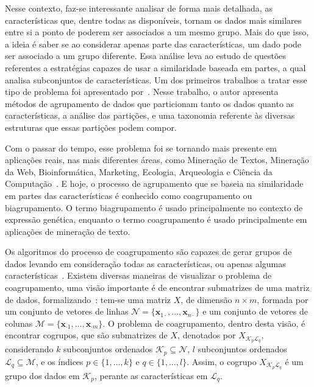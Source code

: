 \documentclass[
    12pt,                %
    oneside,            %
    a4paper,            %
    english,            %
    brazil                %
    ]{abntex2ppgsi}
\begin{document}
Nesse contexto, faz-se interessante analisar de forma mais detalhada, as características que, dentre todas as disponíveis, tornam os dados mais similares entre si a ponto de poderem ser associados a um mesmo grupo.
Mais do que isso, a ideia é saber se ao considerar apenas parte das características, um dado pode ser associado a um grupo diferente.
Essa análise leva ao estudo de questões referentes a estratégias capazes de usar a similaridade baseada em partes, a qual analisa subconjuntos de características.
Um dos primeiros trabalhos a tratar esse tipo de problema foi apresentado por~.
Nesse trabalho, o autor apresenta métodos de agrupamento de dados que particionam tanto os dados quanto as características, a análise das partições, e uma taxonomia referente às diversas estruturas que essas partições podem compor.

Com o passar do tempo, esse problema foi se tornando mais presente em aplicações reais, nas mais diferentes áreas, como Mineração de Textos, Mineração da Web, Bioinformática, Marketing, Ecologia, Arqueologia e Ciência da Computação~\cite{Govaert2013}.
E hoje, o processo de agrupamento que se baseia na similaridade em partes das características é conhecido como coagrupamento ou biagrupamento.
O termo biagrupamento é usado principalmente no contexto de expressão genética, enquanto o termo coagrupamento é usado principalmente em aplicações de mineração de texto.

Os algoritmos do processo de coagrupamento são capazes de gerar grupos de dados levando em consideração todas as características, ou apenas algumas características~\cite{Franca2010,Madeira2004}.
Existem diversas maneiras de visualizar o problema de coagrupamento, uma visão importante é de encontrar submatrizes de uma matriz de dados, formalizando~\cite{Madeira2004}: tem-se uma matriz $X$, de dimensão $n \times m$, formada por um conjunto de vetores de linhas $\mathcal{N} = \{ \mathbf{x}_{1 \cdot}, \dots, \mathbf{x}_{n \cdot} \}$ e um conjunto de vetores de colunas $\mathcal{M} = \{ \mathbf{x}_{\cdot 1}, \dots, \mathbf{x}_{\cdot m} \}$.
O problema de coagrupamento, dentro desta visão, é encontrar cogrupos, que são submatrizes de $X$, denotados por $X_{\mathcal{K}_p \mathcal{L}_q}$, considerando $k$ subconjuntos ordenados $\mathcal{K}_p \subseteq \mathcal{N}$, $l$ subconjuntos ordenados $\mathcal{L}_q \subseteq \mathcal{M}$, e os índices $p \in \{ 1, \dots, k\}$ e $q \in \{1, \dots, l\}$.
Assim, o cogrupo $X_{\mathcal{K}_p \mathcal{L}_q}$ é um grupo dos dados em $\mathcal{K}_p$, perante as características em $\mathcal{L}_q$.
\end{document}
